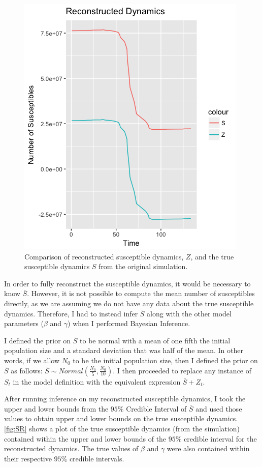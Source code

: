 \documentclass{article}
\begin{document}
\begin{figure}[htbp]
\includegraphics[scale=.5, center]{ZvsSplot.png}
\caption{Comparison of reconstructed susceptible dynamics, $Z$, and the true susceptible dynamics $S$ from the original simulation.}
\label{fig:ZvsS}
\end{figure}

In order to fully reconstruct the susceptible dynamics, it would be necessary to know $\bar{S}$. However, it is not possible to compute the mean number of susceptibles directly, as we are assuming we do not have any data about the true susceptible dynamics. Therefore, I had to instead infer $\bar{S}$ along with the other model parameters ($\beta$ and $\gamma$) when I performed Bayesian Inference. 

I defined the prior on $\bar{S}$ to be normal with a mean of one fifth the initial population size and a standard deviation that was half of the mean. In other words, if we allow $N_{0}$ to be the initial population size, then I defined the prior on $\bar{S}$ as follows: $\bar{S} \sim Normal(\frac{N_{0}}{5}, \frac{N_{0}}{10})$. I then proceeded to replace any instance of $S_{t}$ in the model definition with the equivalent expression $\bar{S} + Z_{t}$. 

After running inference on my reconstructed susceptible dynamics, I took the upper and lower bounds from the $95\%$ Credible Interval of $\bar{S}$ and used those values to obtain upper and lower bounds on the true susceptible dynamics. \ref{fig:SR} shows a plot of the true susceptible dynamics (from the simulation) contained within the upper and lower bounds of the $95\%$ credible interval for the reconstructed dynamics. The true values of $\beta$ and $\gamma$ were also contained within their respective $95\%$ credible intervals. 
\end{document}
